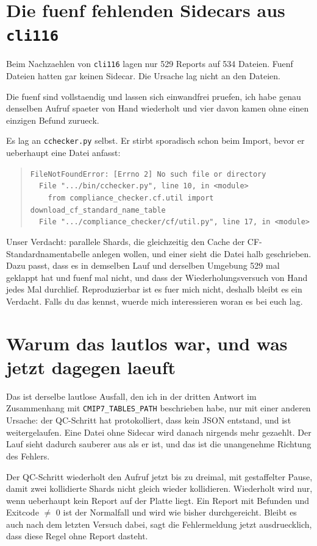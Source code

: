 \documentclass[11pt,a4paper]{article}
\newcommand{\code}[1]{\texttt{\small #1}}
\begin{document}
\section{Die fuenf fehlenden Sidecars aus \code{cli116}}

Beim Nachzaehlen von \code{cli116} lagen nur 529 Reports auf 534 Dateien. Fuenf
Dateien hatten gar keinen Sidecar. Die Ursache lag nicht an den Dateien.

Die fuenf sind vollstaendig und lassen sich einwandfrei
pruefen, ich habe genau denselben Aufruf spaeter von Hand wiederholt und vier davon
kamen ohne einen einzigen Befund zurueck.

Es lag an \code{cchecker.py} selbst. Er stirbt sporadisch schon beim Import, bevor er
ueberhaupt eine Datei anfasst:

\begin{quote}
\code{FileNotFoundError: [Errno 2] No such file or directory}\\
\code{~~File ".../bin/cchecker.py", line 10, in <module>}\\
\code{~~~~from compliance\_checker.cf.util import download\_cf\_standard\_name\_table}\\
\code{~~File ".../compliance\_checker/cf/util.py", line 17, in <module>}
\end{quote}

Unser Verdacht: parallele Shards, die gleichzeitig den Cache der
CF-Standardnamentabelle anlegen wollen, und einer sieht die Datei halb geschrieben.
Dazu passt, dass es in demselben Lauf und derselben Umgebung 529 mal geklappt hat
und fuenf mal nicht, und dass der Wiederholungsversuch von Hand jedes Mal
durchlief. Reproduzierbar ist es fuer mich nicht, deshalb bleibt es ein Verdacht.
Falls du das kennst, wuerde mich interessieren woran es bei euch lag.

\section{Warum das lautlos war, und was jetzt dagegen laeuft}

Das ist derselbe lautlose Ausfall, den ich in der dritten Antwort im Zusammenhang mit
\code{CMIP7\_TABLES\_PATH} beschrieben habe, nur mit einer anderen Ursache: der
QC-Schritt hat protokolliert, dass kein JSON entstand, und ist weitergelaufen. Eine
Datei ohne Sidecar wird danach nirgends mehr gezaehlt. Der Lauf sieht dadurch
sauberer aus als er ist, und das ist die unangenehme Richtung des Fehlers.

Der QC-Schritt wiederholt den Aufruf jetzt bis zu dreimal, mit gestaffelter Pause,
damit zwei kollidierte Shards nicht gleich wieder kollidieren. Wiederholt wird nur,
wenn ueberhaupt kein Report auf der Platte liegt. Ein Report mit Befunden und
Exitcode $\neq$ 0 ist der Normalfall und wird wie bisher durchgereicht. Bleibt es
auch nach dem letzten Versuch dabei, sagt die Fehlermeldung jetzt ausdruecklich,
dass diese Regel ohne Report dasteht.
\end{document}
